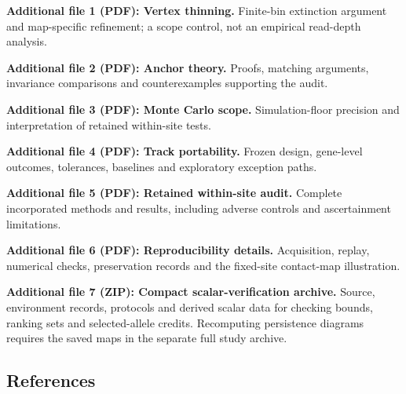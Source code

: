 \documentclass[
  11pt,
]{article}
\begin{document}
\textbf{Additional file 1 (PDF): Vertex thinning.} Finite-bin extinction
argument and map-specific refinement; a scope control, not an empirical
read-depth analysis.

\textbf{Additional file 2 (PDF): Anchor theory.} Proofs, matching
arguments, invariance comparisons and counterexamples supporting the
audit.

\textbf{Additional file 3 (PDF): Monte Carlo scope.} Simulation-floor
precision and interpretation of retained within-site tests.

\textbf{Additional file 4 (PDF): Track portability.} Frozen design,
gene-level outcomes, tolerances, baselines and exploratory exception
paths.

\textbf{Additional file 5 (PDF): Retained within-site audit.} Complete
incorporated methods and results, including adverse controls and
ascertainment limitations.

\textbf{Additional file 6 (PDF): Reproducibility details.} Acquisition,
replay, numerical checks, preservation records and the fixed-site
contact-map illustration.

\textbf{Additional file 7 (ZIP): Compact scalar-verification archive.}
Source, environment records, protocols and derived scalar data for
checking bounds, ranking sets and selected-allele credits. Recomputing
persistence diagrams requires the saved maps in the separate full study
archive.

\subsection{References}\label{references}
\end{document}
